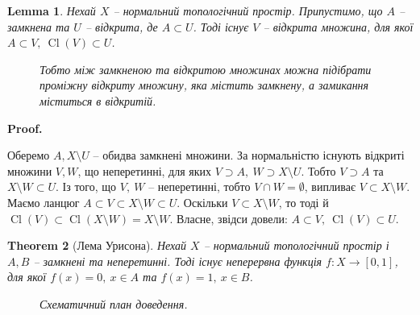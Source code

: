 \documentclass[a4paper, 10pt]{article}
\makeatletter
\theoremstyle{theoremdd}
\newtheorem{theorem}{Theorem}[subsection]
\newtheorem{lemma}[theorem]{Lemma}
\DeclareMathOperator{\Cl}{Cl}
\renewenvironment{proof}[1][Proof.\\]{\par
\pushQED{\hfill \qed}%
\normalfont \topsep6\p@\@plus6\p@\relax
\trivlist
\item\relax
{\bfseries
#1\@addpunct{.}}\hspace\labelsep\ignorespaces
}{%
\popQED\endtrivlist\@endpefalse
}
\makeatother
\begin{document}
\begin{lemma}
\label{between_closed_and_open}
Нехай $X$ -- нормальний топологічний простір. Припустимо, що $A$ -- замкнена та $U$ -- відкрита, де $A \subset U$. Тоді існує $V$ -- відкрита множина, для якої $A \subset V,\ \Cl(V) \subset U$.
\begin{figure}[H]
\centering
{}
\caption*{Тобто між замкненою та відкритою множинах можна підібрати проміжну відкриту множину, яка містить замкнену, а замикання міститься в відкритій.}
\end{figure}
\end{lemma}

\begin{proof}
Оберемо $A, X \setminus U$ -- обидва замкнені множини. За нормальністю існують відкриті множини $V,W$, що неперетинні, для яких $V \supset A,\ W \supset X \setminus U$. Тобто $V \supset A$ та $X \setminus W \subset U$. Із того, що $V,\ W$ -- неперетинні, тобто $V \cap W = \emptyset$, випливає $V \subset X \setminus W$. Маємо ланцюг $A \subset V \subset X \setminus W \subset U$. Оскільки $V \subset X \setminus W$, то тоді й $\Cl(V) \subset \Cl(X \setminus W) = X \setminus W$. Власне, звідси довели: $A \subset V,\ \Cl(V) \subset U$.
\end{proof}

\begin{theorem}[Лема Урисона]
Нехай $X$ -- нормальний топологічний простір і $A,B$ -- замкнені та неперетинні. Тоді існує неперервна функція $f \colon X \to [0,1]$, для якої $f(x) = 0,\ x \in A$ та $f(x) = 1,\ x \in B$.
\begin{figure}[H]
\centering
{}
\caption*{Схематичний план доведення.}
\end{figure}
\end{theorem}
\end{document}
